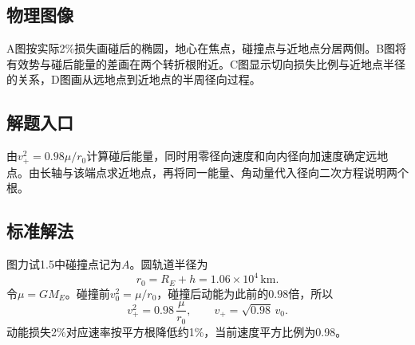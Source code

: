 \documentclass[UTF8,fontset=fandol,a4paper,11pt]{ctexart}
\begin{document}


\subsection*{物理图像}

A图按实际2\%损失画碰后的椭圆，地心在焦点，碰撞点与近地点分居两侧。B图将有效势与碰后能量的差画在两个转折根附近。C图显示切向损失比例与近地点半径的关系，D图画从远地点到近地点的半周径向过程。



\subsection*{解题入口}

由$v_+^2=0.98\mu/r_0$计算碰后能量，同时用零径向速度和向内径向加速度确定远地点。由长轴与该端点求近地点，再将同一能量、角动量代入径向二次方程说明两个根。



\subsection*{标准解法}


图力试1.5中碰撞点记为$A$。圆轨道半径为
\[
r_0=R_E+h=1.06\times10^4\,\mathrm{km}.
\]
令$\mu=GM_E$。碰撞前$v_0^2=\mu/r_0$，碰撞后动能为此前的$0.98$倍，所以
\[
v_+^2=0.98\,\frac{\mu}{r_0},\qquad
v_+=\sqrt{0.98}\,v_0.
\]
动能损失2\%对应速率按平方根降低约1\%，当前速度平方比例为0.98。
\end{document}
